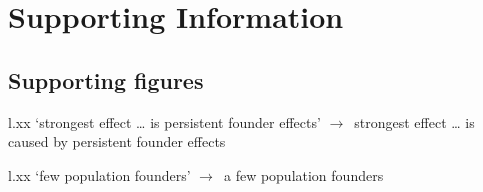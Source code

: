 \documentclass[11pt]{article}
\newenvironment{my_description}
{\begin{description}
  \setlength{\itemsep}{2pt}
  \setlength{\parskip}{0pt}
  \setlength{\parsep}{0pt}}
{\end{description}}
\newcommand{\ra}{$\rightarrow$\ }
\begin{document}
\section{Supporting Information}

\subsection{Supporting figures}

\begin{my_description}
	\item[l.xx] `strongest effect \ldots{} is persistent founder effects' \ra strongest effect \ldots{} is caused by persistent founder effects
	\item[l.xx] `few population founders' \ra a few population founders
\end{my_description}



\end{document}
